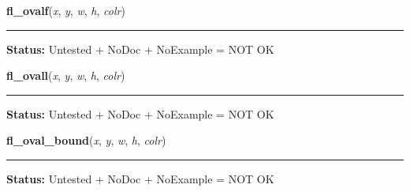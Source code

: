     \label{xformslib:library:fl_ovalf}

    \vspace{0.5ex}

\hspace{.8\funcindent}\begin{boxedminipage}{\funcwidth}

    \raggedright \textbf{fl\_ovalf}(\textit{x}, \textit{y}, \textit{w}, \textit{h}, \textit{colr})

    \vspace{-1.5ex}

    \rule{\textwidth}{0.5\fboxrule}
\setlength{\parskip}{2ex}
\setlength{\parskip}{1ex}
\textbf{Status:} Untested + NoDoc + NoExample = NOT OK



    \end{boxedminipage}

    \label{xformslib:library:fl_ovall}

    \vspace{0.5ex}

\hspace{.8\funcindent}\begin{boxedminipage}{\funcwidth}

    \raggedright \textbf{fl\_ovall}(\textit{x}, \textit{y}, \textit{w}, \textit{h}, \textit{colr})

    \vspace{-1.5ex}

    \rule{\textwidth}{0.5\fboxrule}
\setlength{\parskip}{2ex}
\setlength{\parskip}{1ex}
\textbf{Status:} Untested + NoDoc + NoExample = NOT OK



    \end{boxedminipage}

    \label{xformslib:library:fl_ovalbound}

    \vspace{0.5ex}

\hspace{.8\funcindent}\begin{boxedminipage}{\funcwidth}

    \raggedright \textbf{fl\_oval\_bound}(\textit{x}, \textit{y}, \textit{w}, \textit{h}, \textit{colr})

    \vspace{-1.5ex}

    \rule{\textwidth}{0.5\fboxrule}
\setlength{\parskip}{2ex}
\setlength{\parskip}{1ex}
\textbf{Status:} Untested + NoDoc + NoExample = NOT OK



    \end{boxedminipage}


